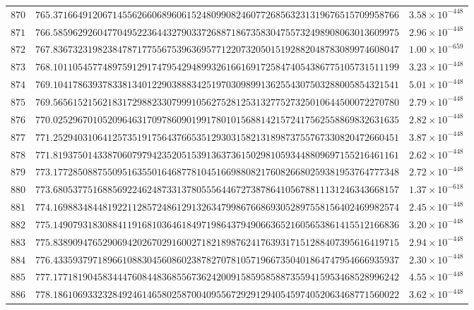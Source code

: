\documentclass[12pt,reqno]{amsart}
\theoremstyle{remark}
\begin{document}
\begin{longtable}{clc}
$870$ & $765.3716649120671455626606896061524809908246077268563231319676515709958766$ & $3.58\times 10^{-448}$ \\
$871$ & $766.5859629260477049522364432790337268871867358304755732498908063013609975$ & $2.96\times 10^{-448}$ \\
$872$ & $767.8367323198238478717755675396369577122073205015192882048783089974608047$ & $1.00\times 10^{-659}$ \\
$873$ & $768.1011054577489759129174795429489932616616917258474054386775105731511199$ & $3.23\times 10^{-448}$ \\
$874$ & $769.1041786393783381340122903888342519703098991362554307503288005854321541$ & $5.01\times 10^{-448}$ \\
$875$ & $769.5656152156218317298823307999105627528125313277527325010644500072270780$ & $2.79\times 10^{-448}$ \\
$876$ & $770.0252967010520964631709786090199178010156881421572417562558869832631635$ & $2.82\times 10^{-448}$ \\
$877$ & $771.2529403106412573519175643766535129303158213189873755767330820472660451$ & $3.87\times 10^{-448}$ \\
$878$ & $771.8193750143387060797942352051539136373615029810593448809697155216461161$ & $2.62\times 10^{-448}$ \\
$879$ & $773.1772850887550951635501646877810451669880821760826680259381953764777348$ & $2.72\times 10^{-448}$ \\
$880$ & $773.6805377516885692246248733137805556446727387864105678811131246343668157$ & $1.37\times 10^{-618}$ \\
$881$ & $774.1698834844819221128572486129132634799867668693052897558156402469982574$ & $2.45\times 10^{-448}$ \\
$882$ & $775.1490793183088411916810364618497198643794906636521605653861415512166836$ & $3.20\times 10^{-448}$ \\
$883$ & $775.8389094765290694202670291600271821898762417639317151288407395616419715$ & $2.94\times 10^{-448}$ \\
$884$ & $776.4335937971896610883045608602387827078105719667350401864747954666935937$ & $2.30\times 10^{-448}$ \\
$885$ & $777.1771819045834447608448368556736242009158595858873559415953468528996242$ & $4.55\times 10^{-448}$ \\
$886$ & $778.1861069332328492461465802587004095567292912940545974052063468771560022$ & $3.62\times 10^{-448}$ \\

\end{longtable}
\end{document}
